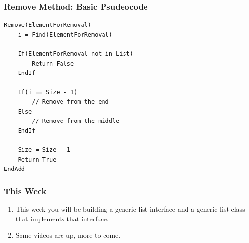 \documentclass{beamer}
\begin{document}
\begin{frame}[fragile]
    \frametitle{Remove Method: Basic Psudeocode}
    \begin{lstlisting}[basicstyle=\small]
Remove(ElementForRemoval)
    i = Find(ElementForRemoval)

    If(ElementForRemoval not in List) 
        Return False
    EndIf
    
    If(i == Size - 1)
        // Remove from the end
    Else
        // Remove from the middle
    EndIf

    Size = Size - 1
    Return True
EndAdd
    \end{lstlisting}
\end{frame}

\begin{frame}[fragile]
    \frametitle{This Week}
    \begin{enumerate}
        \item This week you will be building a generic list interface and a generic list class that implements that interface.
        \item Some videos are up, more to come.
    \end{enumerate}
\end{frame}
\end{document}
